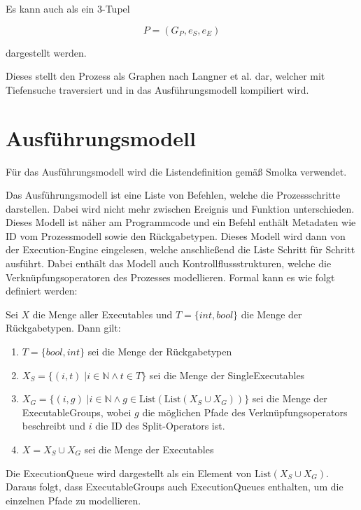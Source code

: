\noindent Es kann auch als ein 3-Tupel 

$$P = (G_P, e_S, e_E)$$

\noindent dargestellt werden.

\noindent Dieses stellt den Prozess als Graphen nach Langner et al. dar, welcher mit Tiefensuche traversiert
und in das Ausführungsmodell kompiliert wird. 

\section{Ausführungsmodell}
\label{ausfuehrungsmodell}

Für das Ausführungsmodell wird die Listendefinition gemäß Smolka \cite{smolka_programmierung_2012} verwendet.

\noindent Das Ausführungsmodell ist eine Liste von Befehlen, welche die Prozessschritte darstellen. Dabei wird nicht mehr zwischen Ereignis und 
Funktion unterschieden. Dieses Modell ist näher am Programmcode und ein Befehl enthält Metadaten wie ID vom Prozessmodell sowie den Rückgabetypen. Dieses 
Modell wird dann von der Execution-Engine eingelesen, welche anschließend die Liste Schritt für Schritt ausführt. Dabei enthält das Modell
auch Kontrollflussstrukturen, welche die Verknüpfungsoperatoren des Prozesses modellieren. Formal kann es wie folgt definiert werden:

\noindent Sei $X$ die Menge aller Executables und $T = \{int, bool\}$ die Menge der Rückgabetypen. Dann gilt:

\begin{enumerate}
    \item $T = \{bool, int\}$ sei die Menge der Rückgabetypen
    \item $X_S = \{(i,t)\; | i \in \mathbb{N} \land t \in T\}$ sei die Menge der SingleExecutables 
    \item {
        $X_G = \{(i, g)\; | i \in \mathbb{N} \land g \in \text{List}(\text{List}(X_S \cup X_G))\}$ sei die Menge der ExecutableGroups, wobei $g$ die möglichen Pfade 
        des Verknüpfungsoperators beschreibt und $i$ die ID des Split-Operators ist.
    }
    \item $X = X_S \cup X_G$ sei die Menge der Executables
\end{enumerate}

\noindent Die ExecutionQueue wird dargestellt als ein Element von $\text{List}(X_S \cup X_G)$. Daraus folgt, dass ExecutableGroups auch ExecutionQueues enthalten, um die einzelnen Pfade zu modellieren.

